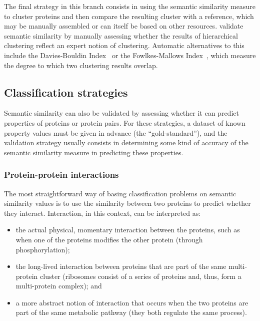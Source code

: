The final strategy in this branch consists in using the semantic similarity measure to cluster proteins and then compare the resulting cluster with a reference, which may be manually assembled or can itself be based on other resources. \citet{Wang2007} validate semantic similarity by manually assessing whether the results of hierarchical clustering reflect an expert notion of clustering. Automatic alternatives to this include the Davies-Bouldin Index~\citep{Davies1979} or the Fowlkes-Mallows Index~\citep{Fowlkes1983}, which measure the degree to which two clustering results overlap.


\subsection{Classification strategies} \label{sub:hierarchy/classification}

Semantic similarity can also be validated by assessing whether it can predict properties of proteins or protein pairs. For these strategies, a dataset of known property values must be given in advance (the ``gold-standard''), and the validation strategy usually consists in determining some kind of accuracy of the semantic similarity measure in predicting these properties.


\subsubsection{Protein-protein interactions}

The most straightforward way of basing classification problems on semantic similarity values is to use the similarity between two proteins to predict whether they interact. Interaction, in this context, can be interpreted as:
\begin{itemize}
    \item the actual physical, momentary interaction between the proteins, such as when one of the proteins modifies the other protein (\eg through phosphorylation);
    \item the long-lived interaction between proteins that are part of the same multi-protein cluster (\eg ribosomes consist of a series of proteins and, thus, form a multi-protein complex); and
    \item a more abstract notion of interaction that occurs when the two proteins are part of the same metabolic pathway (\eg they both regulate the same process).
\end{itemize}

